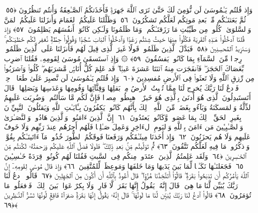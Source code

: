  وَإِذ قُلتُم يَـٰمُوسَىٰ لَن نُّؤمِنَ لَكَ حَتَّىٰ نَرَى ٱللَّهَ جَهرَةًۭ فَأَخَذَتكُمُ ٱلصَّـٰعِقَةُ وَأَنتُم تَنظُرُونَ ﴿٥٥﴾
 ثُمَّ بَعَثنَـٰكُم مِّنۢ بَعدِ مَوتِكُم لَعَلَّكُم تَشكُرُونَ ﴿٥٦﴾
 وَظَلَّلنَا عَلَيكُمُ ٱلغَمَامَ وَأَنزَلنَا عَلَيكُمُ ٱلمَنَّ وَٱلسَّلوَىٰ ۖ كُلُوا۟ مِن طَيِّبَٰتِ مَا رَزَقنَـٰكُم ۖ وَمَا ظَلَمُونَا وَلَـٰكِن كَانُوٓا۟ أَنفُسَهُم يَظلِمُونَ ﴿٥٧﴾
 وَإِذ قُلنَا ٱدخُلُوا۟ هَـٰذِهِ ٱلقَريَةَ فَكُلُوا۟ مِنهَا حَيثُ شِئتُم رَغَدًۭا وَٱدخُلُوا۟ ٱلبَابَ سُجَّدًۭا وَقُولُوا۟ حِطَّةٌۭ نَّغفِر لَكُم خَطَٰيَـٰكُم ۚ وَسَنَزِيدُ ٱلمُحسِنِينَ ﴿٥٨﴾
 فَبَدَّلَ ٱلَّذِينَ ظَلَمُوا۟ قَولًا غَيرَ ٱلَّذِى قِيلَ لَهُم فَأَنزَلنَا عَلَى ٱلَّذِينَ ظَلَمُوا۟ رِجزًۭا مِّنَ ٱلسَّمَآءِ بِمَا كَانُوا۟ يَفسُقُونَ ﴿٥٩﴾
 ۞ وَإِذِ ٱستَسقَىٰ مُوسَىٰ لِقَومِهِۦ فَقُلنَا ٱضرِب بِّعَصَاكَ ٱلحَجَرَ ۖ فَٱنفَجَرَت مِنهُ ٱثنَتَا عَشرَةَ عَينًۭا ۖ قَد عَلِمَ كُلُّ أُنَاسٍۢ مَّشرَبَهُم ۖ كُلُوا۟ وَٱشرَبُوا۟ مِن رِّزقِ ٱللَّهِ وَلَا تَعثَوا۟ فِى ٱلأَرضِ مُفسِدِينَ ﴿٦٠﴾
 وَإِذ قُلتُم يَـٰمُوسَىٰ لَن نَّصبِرَ عَلَىٰ طَعَامٍۢ وَٟحِدٍۢ فَٱدعُ لَنَا رَبَّكَ يُخرِج لَنَا مِمَّا تُنۢبِتُ ٱلأَرضُ مِنۢ بَقلِهَا وَقِثَّآئِهَا وَفُومِهَا وَعَدَسِهَا وَبَصَلِهَا ۖ قَالَ أَتَستَبدِلُونَ ٱلَّذِى هُوَ أَدنَىٰ بِٱلَّذِى هُوَ خَيرٌ ۚ ٱهبِطُوا۟ مِصرًۭا فَإِنَّ لَكُم مَّا سَأَلتُم ۗ وَضُرِبَت عَلَيهِمُ ٱلذِّلَّةُ وَٱلمَسكَنَةُ وَبَآءُو بِغَضَبٍۢ مِّنَ ٱللَّهِ ۗ ذَٟلِكَ بِأَنَّهُم كَانُوا۟ يَكفُرُونَ بِـَٔايَـٰتِ ٱللَّهِ وَيَقتُلُونَ ٱلنَّبِيِّۦنَ بِغَيرِ ٱلحَقِّ ۗ ذَٟلِكَ بِمَا عَصَوا۟ وَّكَانُوا۟ يَعتَدُونَ ﴿٦١﴾
 إِنَّ ٱلَّذِينَ ءَامَنُوا۟ وَٱلَّذِينَ هَادُوا۟ وَٱلنَّصَـٰرَىٰ وَٱلصَّـٰبِـِٔينَ مَن ءَامَنَ بِٱللَّهِ وَٱليَومِ ٱلءَاخِرِ وَعَمِلَ صَـٰلِحًۭا فَلَهُم أَجرُهُم عِندَ رَبِّهِم وَلَا خَوفٌ عَلَيهِم وَلَا هُم يَحزَنُونَ ﴿٦٢﴾
 وَإِذ أَخَذنَا مِيثَـٰقَكُم وَرَفَعنَا فَوقَكُمُ ٱلطُّورَ خُذُوا۟ مَآ ءَاتَينَـٰكُم بِقُوَّةٍۢ وَٱذكُرُوا۟ مَا فِيهِ لَعَلَّكُم تَتَّقُونَ ﴿٦٣﴾
 ثُمَّ تَوَلَّيتُم مِّنۢ بَعدِ ذَٟلِكَ ۖ فَلَولَا فَضلُ ٱللَّهِ عَلَيكُم وَرَحمَتُهُۥ لَكُنتُم مِّنَ ٱلخَـٰسِرِينَ ﴿٦٤﴾
 وَلَقَد عَلِمتُمُ ٱلَّذِينَ ٱعتَدَوا۟ مِنكُم فِى ٱلسَّبتِ فَقُلنَا لَهُم كُونُوا۟ قِرَدَةً خَـٰسِـِٔينَ ﴿٦٥﴾
 فَجَعَلنَـٰهَا نَكَـٰلًۭا لِّمَا بَينَ يَدَيهَا وَمَا خَلفَهَا وَمَوعِظَةًۭ لِّلمُتَّقِينَ ﴿٦٦﴾
 وَإِذ قَالَ مُوسَىٰ لِقَومِهِۦٓ إِنَّ ٱللَّهَ يَأمُرُكُم أَن تَذبَحُوا۟ بَقَرَةًۭ ۖ قَالُوٓا۟ أَتَتَّخِذُنَا هُزُوًۭا ۖ قَالَ أَعُوذُ بِٱللَّهِ أَن أَكُونَ مِنَ ٱلجَٰهِلِينَ ﴿٦٧﴾
 قَالُوا۟ ٱدعُ لَنَا رَبَّكَ يُبَيِّن لَّنَا مَا هِىَ ۚ قَالَ إِنَّهُۥ يَقُولُ إِنَّهَا بَقَرَةٌۭ لَّا فَارِضٌۭ وَلَا بِكرٌ عَوَانٌۢ بَينَ ذَٟلِكَ ۖ فَٱفعَلُوا۟ مَا تُؤمَرُونَ ﴿٦٨﴾
 قَالُوا۟ ٱدعُ لَنَا رَبَّكَ يُبَيِّن لَّنَا مَا لَونُهَا ۚ قَالَ إِنَّهُۥ يَقُولُ إِنَّهَا بَقَرَةٌۭ صَفرَآءُ فَاقِعٌۭ لَّونُهَا تَسُرُّ ٱلنَّـٰظِرِينَ ﴿٦٩﴾
